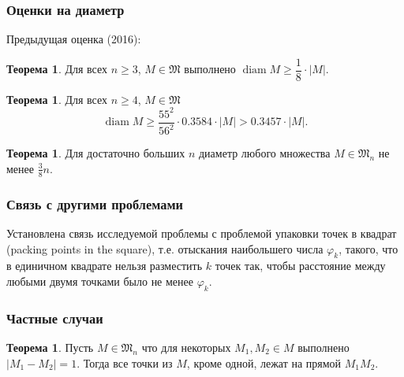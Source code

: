 \documentclass[10pt,pdf,hyperref={unicode}]{beamer}
\theoremstyle{definition}
\newtheorem{ttheorem}[llemma]{Теорема}
\begin{document}
\begin{frame}
	\frametitle{Оценки на диаметр~\cite{our-vmmsh-2018}}
	Предыдущая оценка (2016):

	\begin{ttheorem}
		Для всех $n \geq 3$, $M\in\mathfrak{M}$
		выполнено
		$
			\operatorname{diam} M \geq \dfrac{1}{8} \cdot |M|
			.
		$
	\end{ttheorem}

	\vspace{2em}

	\begin{ttheorem}
		Для всех $n \geq 4$, $M\in\mathfrak{M}$
		\begin{equation*}
			\operatorname{diam} M \geq \frac{55^2}{56^2} \cdot 0.3584 \cdot |M|
			>
			0.3457 \cdot |M|
			.
		\end{equation*}
	\end{ttheorem}


	\begin{ttheorem}
		Для достаточно больших $n$ диаметр любого множества $M\in\mathfrak{M}_n$ не менее $\frac{3}{8}n$.
	\end{ttheorem}

\end{frame}


\begin{frame}
	\frametitle{Связь с другими проблемами~\cite{our-vmmsh-2018}}

	Установлена связь исследуемой проблемы с проблемой упаковки точек в квадрат
	(packing points in the square),
	т.е. отыскания наибольшего числа $\varphi_k$, такого,
	что в единичном квадрате нельзя разместить $k$ точек так,
	чтобы расстояние между любыми двумя точками было не менее $\varphi_k$.
\end{frame}


\begin{frame}
	\frametitle{Частные случаи~\cite{our-vmmsh-2018}}

	\begin{ttheorem}
		\label{prop:edge_one}
		Пусть $M\in\mathfrak{M}_n$
		что для некоторых $M_1, M_2 \in M$ выполнено $|M_1 - M_2| = 1$.
		Тогда все точки из $M$, кроме одной, лежат на прямой $M_1 M_2$.
	\end{ttheorem}
\end{frame}
\end{document}

